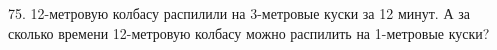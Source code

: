 75. 12-метровую колбасу распилили на 3-метровые куски за 12 минут. А за сколько времени 12-метровую колбасу можно распилить на 1-метровые куски?\\
